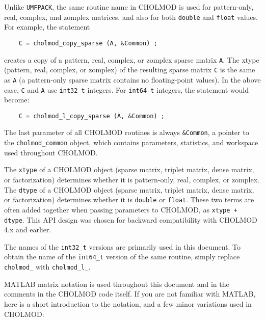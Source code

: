 \documentclass[11pt]{article}
\begin{document}
Unlike {\tt UMFPACK}, the same routine name in CHOLMOD is used for
pattern-only, real, complex, and zomplex matrices, and also for both
{\tt double} and {\tt float} values.  For example, the statement

\begin{verbatim}
    C = cholmod_copy_sparse (A, &Common) ;
\end{verbatim}

creates a copy of a pattern, real, complex, or zomplex sparse matrix {\tt A}.
The xtype (pattern, real, complex, or zomplex) of the resulting sparse matrix
{\tt C} is the same as {\tt A} (a pattern-only sparse matrix contains no
floating-point values).  In the above case, {\tt C} and {\tt A} use {\tt int32\_t}
integers.  For {\tt int64\_t} integers, the statement would become:

\begin{verbatim}
    C = cholmod_l_copy_sparse (A, &Common) ;
\end{verbatim}

The last parameter of all CHOLMOD routines is always {\tt \&Common}, a pointer
to the {\tt cholmod\_common} object, which contains parameters, statistics, and
workspace used throughout CHOLMOD.

The {\tt xtype} of a CHOLMOD object (sparse matrix, triplet matrix, dense
matrix, or factorization) determines whether it is pattern-only, real, complex,
or zomplex.  The {\tt dtype} of a CHOLMOD object (sparse matrix, triplet
matrix, dense matrix, or factorization) determines whether it is {\tt double}
or {\tt float}.  These two terms are often added together when passing
parameters to CHOLMOD, as {\tt xtype + dtype}.  This API design was chosen
for backward compatibility with CHOLMOD 4.x and earlier.

The names of the {\tt int32\_t} versions are primarily used in this document.  To
obtain the name of the {\tt int64\_t} version of the same routine, simply
replace {\tt cholmod\_} with {\tt cholmod\_l\_}.

MATLAB matrix notation is used throughout this document and in the comments in
the CHOLMOD code itself.  If you are not familiar with MATLAB, here is a short
introduction to the notation, and a few minor variations used in CHOLMOD:
\end{document}
